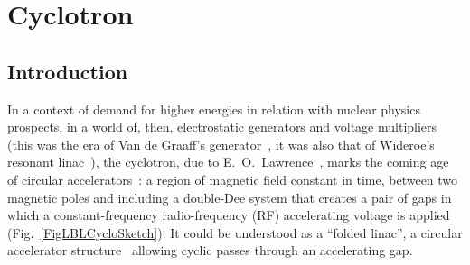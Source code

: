



\chapter[Cyclotron]{Cyclotron}\label{chapCyclotron}


\section{Introduction \label{secCycloIntro}}

In a context of demand for higher energies in relation with nuclear physics prospects,
 in a world of, then, electrostatic generators and voltage multipliers~\cite{CockcroftWalton}
(this was the era 
of Van de Graaff's generator~\cite{VandeGraaff},  
it was also that of Wideroe's resonant linac~\cite{RWideroe}),  
the cyclotron, due to E.~O.~Lawrence~\cite{EOLawrence},  marks the coming age of circular accelerators~:
a region of magnetic field constant in time, between two magnetic poles 
and including a double-Dee system that creates a pair of  gaps in which a 
constant-frequency radio-frequency (RF) accelerating voltage is applied (Fig.~\ref{FigLBLCycloSketch}).  
It could be understood as a  ``folded linac'', a circular accelerator structure~\cite{TBRef'd} 
allowing cyclic  passes through an accelerating gap. 


